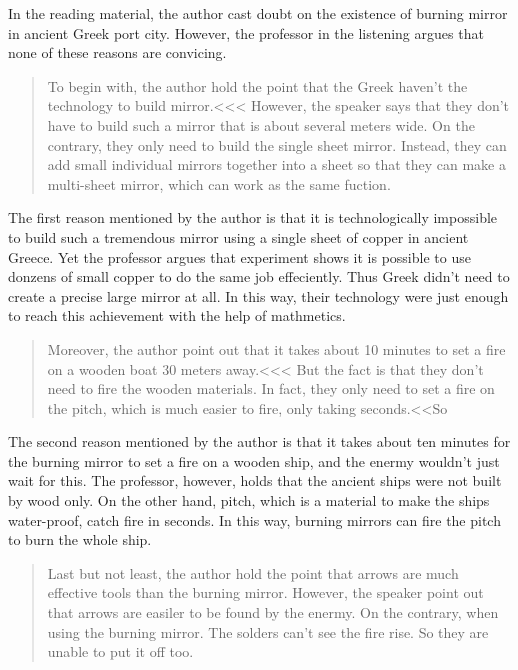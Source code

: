 In the reading material, the author cast doubt on the existence of burning mirror in ancient Greek port city. However, the professor in the listening argues that none of these reasons are convicing.

\begin{quote}
    To begin with, the author hold the point that the Greek haven't the technology to build mirror.<<< However, the speaker says that they don't have to build such a mirror that is about several meters wide. On the contrary, they only need to build the single sheet mirror. Instead, they can add small individual mirrors together into a sheet so that they can make a multi-sheet mirror, which can work as the same fuction.
\end{quote}

The first reason mentioned by the author is that it is technologically impossible to build such a tremendous mirror using a single sheet of copper in ancient Greece. Yet the professor argues that experiment shows it is possible to use donzens of small copper to do the same job effeciently. Thus Greek didn't need to create a precise large mirror at all. In this way, their technology were just enough to reach this achievement with the help of mathmetics.

\begin{quote}
    Moreover, the author point out that it takes about 10 minutes to set a fire on a wooden boat 30 meters away.<<< But the fact is that they don't need to fire the wooden materials. In fact, they only need to set a fire on the pitch, which is much easier to fire, only taking seconds.<<So
\end{quote}

The second reason mentioned by the author is that it takes about ten minutes for the burning mirror to set a fire on a wooden ship, and the enermy wouldn't just wait for this. The professor, however, holds that the ancient ships were not built by wood only. On the other hand, pitch, which is a material to make the ships water-proof, catch fire in seconds. In this way, burning mirrors can fire the pitch to burn the whole ship.

\begin{quote}
    Last but not least, the author hold the point that arrows are much effective tools than the burning mirror. However, the speaker point out that arrows are easiler to be found by the enermy. On the contrary, when using the burning mirror. The solders can't see the fire rise. So they are unable to put it off too.
\end{quote}

